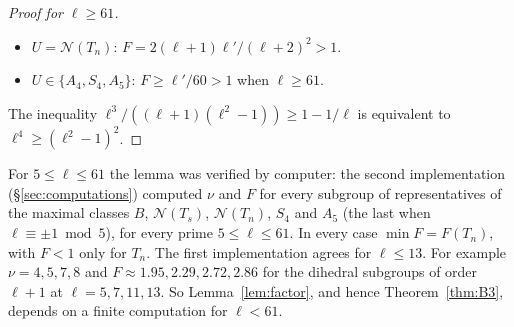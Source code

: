 \documentclass[11pt]{amsart}
\theoremstyle{definition}
\theoremstyle{remark}
\newcommand{\Nor}{\mathcal{N}}     %
\begin{document}
\begin{proof}[Proof for $\ell\ge61$]
\begin{itemize}
  dihedral subgroups of order $\ell+1$. For $T_n$, $F(T_n)=\ell'/(\ell+1)$ (here $\nu(T_n)=\ell+1$), which is $<1$. A
  dihedral $U$ of order $\ell+1$ contains $(\ell+1)/2$ of the reflections of $\Nor(T_n)$, and the other coset of $U$ in
  $\Nor(T_n)$ contains the other $(\ell+1)/2$; the involution of $T_n$ lies in exactly one of the two. Cosets of $U$ not
  in $\Nor(T_n)$ lie in a coset of $\Nor(T_n)$ other than $\Nor(T_n)$, so contain at most $2$ involutions. Hence
  $\nu(U)\le(\ell+3)/2$ and $F(U)\ge4(\ell+1)\ell'/(\ell+3)^2=4\ell^3/((\ell-1)(\ell+3)^2)>1$.
\item $U=\Nor(T_n)$: $F=2(\ell+1)\ell'/(\ell+2)^2>1$.
\item $U\in\{A_4,S_4,A_5\}$: $F\ge\ell'/60>1$ when $\ell\ge61$.
\end{itemize}
The inequality $\ell^3/((\ell+1)(\ell^2-1))\ge1-1/\ell$ is equivalent to $\ell^4\ge(\ell^2-1)^2$.
\end{proof}

For $5\le\ell\le61$ the lemma was verified by computer: the second implementation (\S\ref{sec:computations}) computed $\nu$
and $F$ for every subgroup of representatives of the maximal classes $B$, $\Nor(T_s)$, $\Nor(T_n)$, $S_4$ and $A_5$
(the last when $\ell\equiv\pm1\bmod5$), for every prime $5\le\ell\le61$. In every case $\min F=F(T_n)$, with $F<1$ only
for $T_n$. The first implementation agrees for $\ell\le13$. For example $\nu=4,5,7,8$ and $F\approx1.95,2.29,2.72,2.86$ for the
dihedral subgroups of order $\ell+1$ at $\ell=5,7,11,13$. So Lemma~\ref{lem:factor}, and hence
Theorem~\ref{thm:B3}, depends on a finite computation for $\ell<61$.
\end{document}
